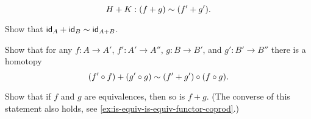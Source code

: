 \begin{exercises}
\begin{subexenum}
\begin{equation*}
H+K:(f+g)\htpy (f'+g').
\end{equation*}
\item Show that $\idfunc[A]+\idfunc[B]\htpy \idfunc[A+B]$.
\item Show that for any $f:A\to A'$, $f':A'\to A''$, $g:B\to B'$, and $g':B'\to B''$ there is a homotopy
\begin{equation*}
(f'\circ f)+(g'\circ g) \htpy (f'+g')\circ (f\circ g).
\end{equation*}
\item \label{ex:coproduct_functor_equivalence}Show that if $f$ and $g$ are equivalences, then so is $f+g$. (The converse of this statement also holds, see \cref{ex:is-equiv-is-equiv-functor-coprod}.)
\end{subexenum}
\end{exercises}
